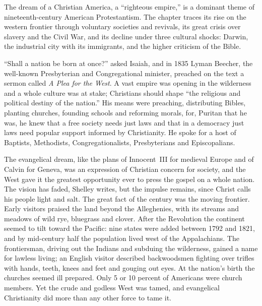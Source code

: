 
\begin{inbrief}
The dream of a Christian America, a ``righteous empire,'' is a dominant theme of nineteenth-century
American Protestantism. The chapter traces its rise on the western frontier through voluntary
societies and revivals, its great crisis over slavery and the Civil War, and its decline under three
cultural shocks: Darwin, the industrial city with its immigrants, and the higher criticism of the
Bible.
\end{inbrief}

``Shall a nation be born at once?'' asked Isaiah, and in 1835 Lyman Beecher, the well-known
Presbyterian and Congregational minister, preached on the text a sermon called \emph{A Plea for the
West}. A vast empire was opening in the wilderness and a whole culture was at stake; Christians
should shape ``the religious and political destiny of the nation.'' His means were preaching,
distributing Bibles, planting churches, founding schools and reforming morals, for, Puritan that he
was, he knew that a free society needs just laws and that in a democracy just laws need popular
support informed by Christianity. He spoke for a host of Baptists, Methodists, Congregationalists,
Presbyterians and Episcopalians.

The evangelical dream, like the plans of Innocent~III for medieval Europe and of Calvin for Geneva, was an expression of Christian concern for society, and the West gave it the greatest opportunity
ever to press the gospel on a whole nation. The vision has faded, Shelley writes, but the impulse
remains, since Christ calls his people light and salt. The great fact of the century was the moving
frontier. Early visitors praised the land beyond the Alleghenies, with its streams and meadows of
wild rye, bluegrass and clover. After the Revolution the continent seemed to tilt toward the Pacific:
nine states were added between 1792 and 1821, and by mid-century half the population lived west of
the Appalachians. The frontiersman, driving out the Indians and subduing the wilderness, gained a
name for lawless living; an English visitor described backwoodsmen fighting over trifles with hands,
teeth, knees and feet and gouging out eyes. At the nation's birth the churches seemed ill prepared.
Only 5 or 10 percent of Americans were church members. Yet the crude and godless West was tamed, and
evangelical Christianity did more than any other force to tame it.


